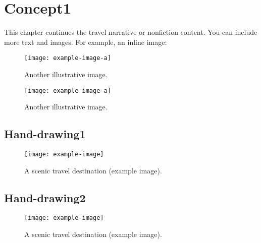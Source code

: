 \newpage
\section{Concept1}
This chapter continues the travel narrative or nonfiction content. You can include more text and images. For example, an inline image:
\begin{figure}[htbp]
  \centering
  \texttt{[image: example-image-a]} 
  \caption{Another illustrative image.}
\end{figure}
\lipsum[1]  %
\begin{figure}[htbp]
  \centering
  \texttt{[image: example-image-a]} 
  \caption{Another illustrative image.}
\end{figure}
\lipsum[2]  %


\newpage
\subsection{Hand-drawing1}
\lipsum[1]  %
\begin{figure}[htbp]
  \centering
  \texttt{[image: example-image]} %
  \caption{A scenic travel destination (example image).}
\end{figure}


\newpage
\subsection{Hand-drawing2}
\lipsum[1]  %
\begin{figure}[htbp]
  \centering
  \texttt{[image: example-image]} %
  \caption{A scenic travel destination (example image).}
\end{figure}
